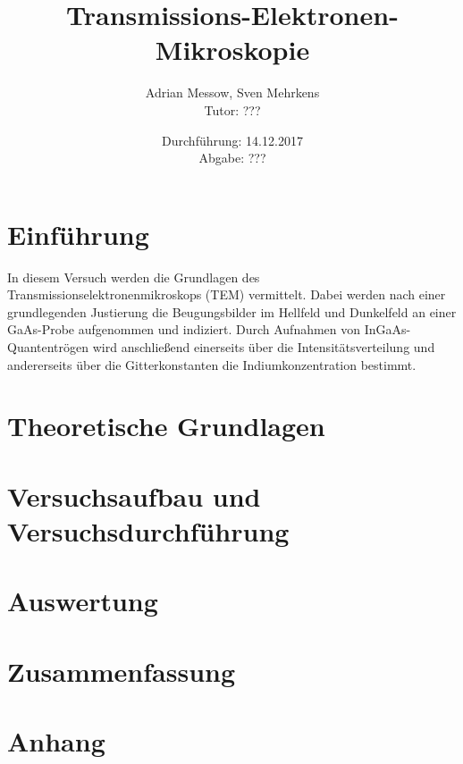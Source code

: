 \documentclass[a4paper,11pt,DIV=11]{scrartcl}
\title{Transmissions-Elektronen-Mikroskopie}
\author{Adrian Messow, Sven Mehrkens \\
Tutor: ???}
\date{Durchführung: 14.12.2017 \\ Abgabe: ??? }
\begin{document}
\maketitle
\section{Einführung}
In diesem Versuch werden die Grundlagen des Transmissionselektronenmikroskops (TEM) vermittelt. Dabei werden nach einer grundlegenden Justierung die Beugungsbilder im Hellfeld und Dunkelfeld an einer GaAs-Probe aufgenommen und indiziert. Durch Aufnahmen von InGaAs-Quantentrögen wird anschließend einerseits über die Intensitätsverteilung und andererseits über die Gitterkonstanten die Indiumkonzentration bestimmt.

\section{Theoretische Grundlagen}
	
\section{Versuchsaufbau und Versuchsdurchführung}

\section{Auswertung}

\section{Zusammenfassung}

\section*{Anhang}
\end{document}
